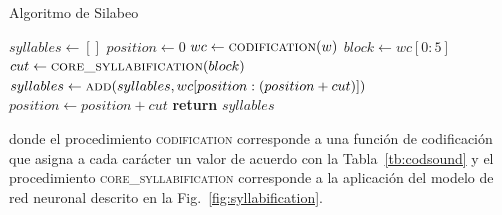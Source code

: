 \begin{megaalgorithm}
	\caption{Algoritmo de Silabeo}
	\label{alg:syllabification}
	\begin{algorithmic}[1]
		\State $syllables\gets []$
		\State $position\gets 0$
		\State $wc\gets \mbox{\textsc{codification}}(w)$
		\State $block\gets wc[0:5]$
		\State $cut\gets \mbox{\textsc{core\_syllabification}}(block)$
		\State $syllables\gets \mbox{\textsc{add}}(syllables,wc[position:(position+cut)])$
		\State $position\gets position + cut$
		\EndWhile
		\State \textbf{return} $syllables$
		\EndProcedure
	\end{algorithmic}
\end{megaalgorithm}
donde el procedimiento \textsc{codification} corresponde a una función de codificación que asigna a cada carácter un valor de acuerdo con la Tabla~\ref{tb:codsound} y el procedimiento \textsc{core\_syllabification} corresponde a la aplicación del modelo de red neuronal descrito en la Fig.~\ref{fig:syllabification}. 

